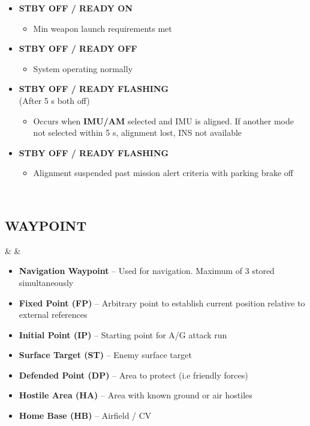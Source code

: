 \documentclass[fontInter]{TechCheck}
\begin{document}
\begin{listlongtable}
\begin{minipage}[t]{\linewidth}
\begin{itemize}
\begin{itemize}
				\end{itemize}
				\item \textbf{STBY OFF / READY ON}
				\begin{itemize}
					\item Min weapon launch requirements met
				\end{itemize}
				\item \textbf{STBY OFF / READY OFF}
				\begin{itemize}
					\item System operating normally
				\end{itemize}
				\item \textbf{STBY OFF / READY FLASHING} \\
				(After 5 s both off)
				\begin{itemize}
					\item Occurs when \textbf{IMU/AM} selected and IMU is aligned. If another mode not selected within 5 s, alignment lost, INS not available
				\end{itemize}
				\item \textbf{STBY OFF / READY FLASHING}
				\begin{itemize}
					\item Alignment suspended past mission alert criteria with parking brake off
				\end{itemize}
			\end{itemize}
		\end{minipage} \\
	\end{listlongtable}

	\clearpage

	\subsection{WAYPOINT}
	\begin{listlongtable}
		\textbf{\textbullet} &   &
		\begin{minipage}[t]{\linewidth}
			\vspace{-7pt}
			\begin{itemize}
				\item \textbf{Navigation Waypoint} -- Used for navigation. Maximum of 3 stored simultaneously
				\item \textbf{Fixed Point (FP)} -- Arbitrary point to establish current position relative to external references
				\item \textbf{Initial Point (IP)} -- Starting point for A/G attack run
				\item \textbf{Surface Target (ST)} -- Enemy surface target
				\item \textbf{Defended Point (DP)} -- Area to protect (i.e friendly forces)
				\item \textbf{Hostile Area (HA)} -- Area with known ground or air hostiles
				\item \textbf{Home Base (HB)} -- Airfield / CV
			\end{itemize}
		\end{minipage} \\
	\end{listlongtable}
\end{document}

